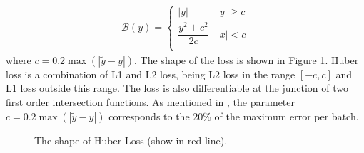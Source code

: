 \begin{equation}\label{berhu-loss}
	\begin{array}{ll}
		\mathcal{B}(y)= \begin{cases}
			|y| & |y| \ge c \\
			\dfrac{y^2 + c^2}{2c} & |x| < c\\
		\end{cases}
	\end{array}
\end{equation}
where $ c=0.2\max (|\tilde y - y|) $. The shape of the loss is shown in Figure \ref{fig:berhu-loss-shape}. Huber loss is a combination of L1 and L2 loss, being L2 loss in the range $ [-c,c] $ and L1 loss outside this range. The loss is also differentiable at the junction of two first order intersection functions. As mentioned in \cite{img2depth}, the parameter $ c=0.2 \max(|\tilde y - y|) $ corresponds to the 20\% of the maximum error per batch. 

\begin{figure}[H]
	\centering
	\captionsetup{width=\linewidth}
	\caption{The shape of Huber Loss (show in red line). }
	\label{fig:berhu-loss-shape}
\end{figure}


